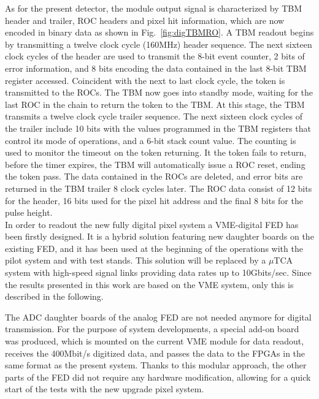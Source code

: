 As for the present detector, the module output signal is characterized by TBM header and trailer, ROC headers and pixel hit information, which are now encoded in binary data as shown in Fig.~\ref{fig:digTBMRO}.
A TBM readout begins by transmitting a twelve clock cycle (160\unit{MHz}) header sequence.
The next sixteen clock cycles of the header are used to transmit the 8-bit event counter, 2 bits of error information, and 8 bits encoding the data contained in the last 8-bit TBM register accessed.
Coincident with the next to last clock cycle, the token is transmitted to the ROCs. The TBM now goes into standby mode, waiting for the last ROC in the chain to return the token to the TBM.
At this stage, the TBM transmits a twelve clock cycle trailer sequence.
The next sixteen clock cycles of the trailer include 10 bits with the values programmed in the TBM registers that control its mode of operations, and a 6-bit stack count value.
The counting is used to monitor the timeout on the token returning. It the token fails to return, before the timer expires, the TBM will automatically issue a ROC reset, ending the token pass.
The data contained in the ROCs are deleted, and error bits are returned in the TBM trailer 8 clock cycles later.
The ROC data consist of 12 bits for the header, 16 bits used for the pixel hit address and the final 8 bits for the pulse height.\\

In order to readout the new fully digital pixel system a VME-digital FED has been firstly designed.
It is a hybrid solution featuring new daughter boards on the existing FED, and it has been used at the beginning of the operations with the pilot system and with test stands.
This solution will be replaced by a $\mu$TCA system with high-speed signal links providing data rates up to 10\unit{Gbits/sec}. 
Since the results presented in this work are based on the VME system, only this is described in the following.

The ADC daughter boards of the analog FED are not needed anymore for digital transmission.
For the purpose of system developments, a special add-on board was produced, which is mounted on the current VME module for data readout, receives the 400\unit{Mbit/s} digitized data, and passes the data to the FPGAs in the same format as the present system.
Thanks to this modular approach, the other parts of the FED did not require any hardware modification, allowing for a quick start of the tests with the new upgrade pixel system.


